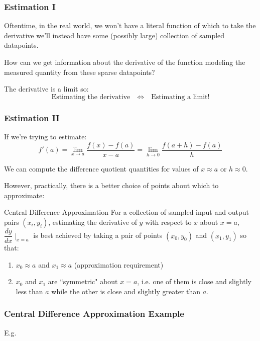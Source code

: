 \documentclass{ltx-talk}
\begin{document}
\begin{frame}
  \frametitle{Estimation I}
  Oftentime, in the real world, we won't have a literal function
  of which to take the derivative \pause we'll instead have some (possibly large) collection of sampled datapoints. \pause

  How can we get information about the derivative of the function modeling the measured quantity from these sparse datapoints? \pause

  The derivative is a limit so: \pause 
  \begin{equation}
    \text{Estimating the derivative} \quad \iff \quad \text{Estimating a limit!} 
  \end{equation} \pause
\end{frame}
\begin{frame}
  \frametitle{Estimation II}
  If we're trying to estimate: \pause
  \begin{equation}
    f'(a) = \lim\limits_{x \rightarrow a} \dfrac{f(x) - f(a)}{x - a} = \lim\limits_{h \rightarrow 0} \dfrac{f(a + h) - f(a)}{h}
  \end{equation} \pause

  We can compute the difference quotient quantities for values of $x \approx a$ or $h \approx 0$. \pause

  However, practically, there is a better choice of points about which to approximate: \pause

  \begin{block}{Central Difference Approximation}
    For a collection of sampled input and output pairs $(x_i, y_i)$, \pause
    estimating the derivative of $y$ with respect to $x$ about $x = a$, $\dfrac{dy}{dx} \mid_{x = a}$ \pause
    is best achieved by taking a pair of points $(x_0, y_0)$ and $(x_1, y_1)$ so that: \pause
    \begin{enumerate}
      \item $x_0 \approx a$ and $x_1 \approx a$ (approximation requirement) \pause
      \item $x_0$ and $x_1$ are ``symmetric" about $x = a$, \pause i.e. one of them is close and slightly less than $a$ while the other is close and slightly greater than $a$. \pause
    \end{enumerate}
  \end{block}
\end{frame}

\begin{frame}
  \frametitle{Central Difference Approximation Example} 

  E.g. \pause
  \vfill
\end{frame}
\end{document}
